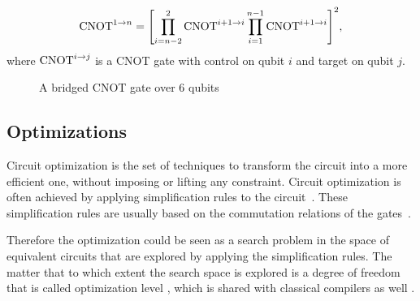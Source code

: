 \begin{equation} 
  \label{eq:bridged-cnot-m-n}
  \operatorname{CNOT}^{1\to n} = \qty[\prod_{i=n - 2}^{2}\operatorname{CNOT}^{i + 1\to i} \prod_{i=1}^{n - 1}\operatorname{CNOT}^{i + 1\to i}]^2,
\end{equation}
where $\operatorname{CNOT}^{i\to j}$ is a CNOT gate with control on qubit $i$ and target on qubit $j$.

\begin{figure}[h!]
  \label{fig:bridged-cnot-m-n}
  \centering
  \caption{A bridged CNOT gate over 6 qubits}
\end{figure}

\subsection{Optimizations}

Circuit optimization is the set of techniques to transform the circuit into a more efficient one, without imposing or lifting any constraint. Circuit optimization is often achieved by applying simplification rules to the circuit~\cite{pointing2021}. These simplification rules are usually based on the commutation relations of the gates~\cite{itoko2019,qiskit2023,sivarajah2021}.

Therefore the optimization could be seen as a search problem in the space of equivalent circuits that are explored by applying the simplification rules. The matter that to which extent the search space is explored is a degree of freedom that is called optimization level \cite{qiskit2023,sivarajah2021}, which is shared with classical compilers as well \cite{aho1986}. 
